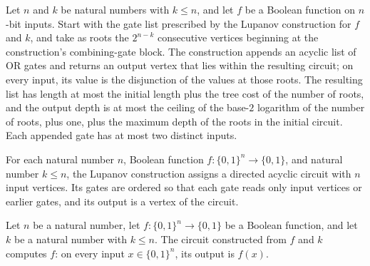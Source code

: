 \begin{theorem}
\label{BoolCircuit.Lupanov.lupGates_spec}
\leanok
{}
Let $n$ and $k$ be natural numbers with $k\le n$, and let $f$ be a Boolean function on
$n$-bit inputs. Start with the gate list prescribed by the Lupanov construction for $f$
and $k$, and take as roots the $2^{n-k}$ consecutive vertices beginning at the
construction's combining-gate block. The construction appends an acyclic list of OR
gates and returns an output vertex that lies within the resulting circuit; on every
input, its value is the disjunction of the values at those roots. The resulting list has
length at most the initial length plus the tree cost of the number of roots, and the
output depth is at most the ceiling of the base-$2$ logarithm of the number of roots,
plus one, plus the maximum depth of the roots in the initial circuit. Each appended gate
has at most two distinct inputs.
\end{theorem}

\begin{definition}
\label{BoolCircuit.Lupanov.lupDAG}
\leanok
{}
For each natural number $n$, Boolean function $f : \{0,1\}^n \to \{0,1\}$, and natural
number $k \le n$, the Lupanov construction assigns a directed acyclic circuit with $n$
input vertices. Its gates are ordered so that each gate reads only input vertices or
earlier gates, and its output is a vertex of the circuit.
\end{definition}

\begin{theorem}
\label{BoolCircuit.Lupanov.lupDAG_eval}
\leanok
{}
Let $n$ be a natural number, let $f:\{0,1\}^n\to\{0,1\}$ be a Boolean function, and
let $k$ be a natural number with $k\le n$. The circuit constructed from $f$ and $k$
computes $f$: on every input $x\in\{0,1\}^n$, its output is $f(x)$.
\end{theorem}

